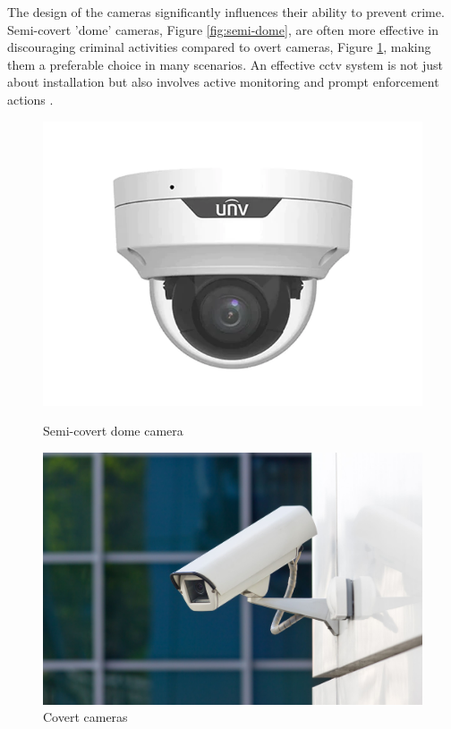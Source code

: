 The design of the cameras significantly influences their ability to prevent crime. Semi-covert 'dome' cameras, Figure \ref{fig:semi-dome}, are often more effective in discouraging criminal activities compared to overt cameras, Figure \ref{fig:covert}, making them a preferable choice in many scenarios. An effective \ac{cctv} system is not just about installation but also involves active monitoring and prompt enforcement actions \cite{rfc4}.
\begin{figure}[h]
    \centering

    \begin{minipage}{0.3\textwidth}
        \centering
        \includegraphics[width=\textwidth]{figs/semi-dome.png} %
        \caption{Semi-covert dome camera}
        \label{fig:semi-dome}
    \end{minipage}
    \hspace{2cm}
    \begin{minipage}{0.32\textwidth}
        \centering
        \includegraphics[width=\textwidth]{figs/overt2.jpg} %
        \caption{Covert cameras}
        \label{fig:covert}
    \end{minipage}
\end{figure}

